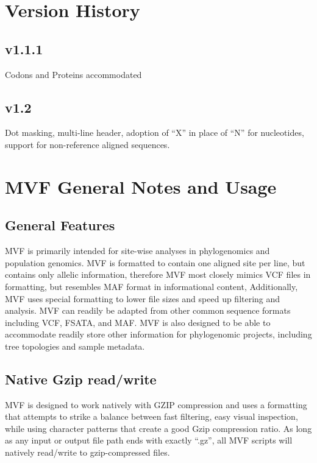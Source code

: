 \documentclass[letterpaper,11pt,english]{sphinxmanual}
\begin{document}
\section{Version History}
\label{\detokenize{mvf_spec:version-history}}

\subsection{v1.1.1}
\label{\detokenize{mvf_spec:v1-1-1}}
Codons and Proteins accommodated


\subsection{v1.2}
\label{\detokenize{mvf_spec:v1-2}}
Dot masking, multi-line header, adoption of “X” in place of “N” for nucleotides, support for non-reference aligned sequences.


\section{MVF General Notes and Usage}
\label{\detokenize{mvf_spec:mvf-general-notes-and-usage}}

\subsection{General Features}
\label{\detokenize{mvf_spec:general-features}}
MVF is primarily intended for site-wise analyses in phylogenomics and population genomics. MVF is formatted to contain one aligned site per line, but contains only allelic information, therefore MVF most closely mimics VCF files in formatting, but resembles MAF format in informational content,  Additionally, MVF uses special formatting to lower file sizes and speed up filtering and analysis.  MVF can readily be adapted from other common sequence formats including VCF, FSATA, and MAF.  MVF is also designed to be able to accommodate readily store other information for phylogenomic projects, including tree topologies and sample metadata.


\subsection{Native Gzip read/write}
\label{\detokenize{mvf_spec:native-gzip-read-write}}
MVF is designed to work natively with GZIP compression and uses a formatting that attempts to strike a balance between fast filtering, easy visual inspection, while using character patterns that create a good Gzip compression ratio. As long as any input or output file path ends with exactly “.gz”, all MVF scripts will natively read/write to gzip-compressed files.
\end{document}
